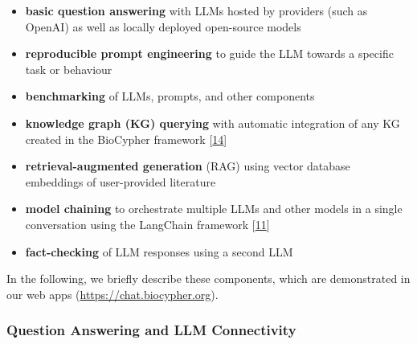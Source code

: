 \begin{itemize}
\item
  \textbf{basic question answering} with LLMs hosted by providers (such as OpenAI) as well as locally deployed open-source models
\item
  \textbf{reproducible prompt engineering} to guide the LLM towards a specific task or behaviour
\item
  \textbf{benchmarking} of LLMs, prompts, and other components
\item
  \textbf{knowledge graph (KG) querying} with automatic integration of any KG created in the BioCypher framework {[}\protect\hyperlink{ref-tr1XjZ1R}{14}{]}
\item
  \textbf{retrieval-augmented generation} (RAG) using vector database embeddings of user-provided literature
\item
  \textbf{model chaining} to orchestrate multiple LLMs and other models in a single conversation using the LangChain framework {[}\protect\hyperlink{ref-UEmjXz02}{11}{]}
\item
  \textbf{fact-checking} of LLM responses using a second LLM
\end{itemize}

In the following, we briefly describe these components, which are demonstrated in our web apps (\url{https://chat.biocypher.org}).

\hypertarget{question-answering-and-llm-connectivity}{%
\subsubsection{Question Answering and LLM Connectivity}\label{question-answering-and-llm-connectivity}}

